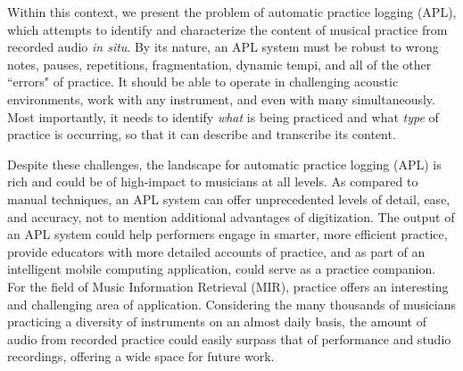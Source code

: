 \documentclass{article}
\begin{document}
Within this context, we present the problem of automatic practice logging (APL), which attempts to identify and characterize the content of musical practice from recorded audio \textit{in situ}.  By its nature, an APL system must be robust to wrong notes, pauses, repetitions, fragmentation, dynamic tempi, and all of the other ``errors" of practice. It should be able to operate in challenging acoustic environments, work with any instrument, and even with many simultaneously. Most importantly, it needs to identify \textit{what} is being practiced and what \textit{type} of practice is occurring, so that it can describe and transcribe its content.    


Despite these challenges, the landscape for automatic practice logging (APL) is rich and could be of high-impact to musicians at all levels. As compared to manual techniques, an APL system can offer unprecedented levels of detail, ease, and accuracy, not to mention additional advantages of digitization. The output of an APL system could help performers engage in smarter, more efficient practice, provide educators with more detailed accounts of practice, and as part of an intelligent mobile computing application, could serve as a practice companion. For the field of Music Information Retrieval (MIR), practice offers an interesting and challenging area of application. Considering the many thousands of musicians practicing a diversity of instruments on an almost daily basis, the amount of audio from recorded practice could easily surpass that of performance and studio recordings, offering a wide space for future work. 

\end{document}
